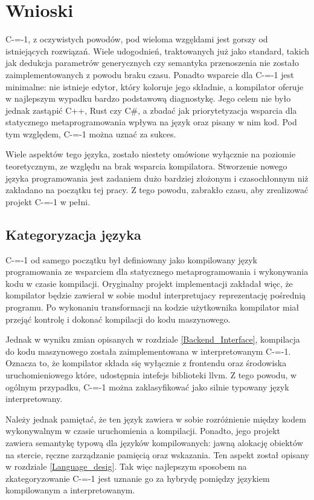 \section{Wnioski}

C-=-1, z oczywistych powodów, pod wieloma wzgęldami jest gorszy od istniejących rozwiązań.
Wiele udogodnień, traktowanych już jako standard, takich jak dedukcja parametrów generycznych czy semantyka przenoszenia nie zostało zaimplementowanych z powodu braku czasu.
Ponadto wsparcie dla C-=-1 jest minimalne: nie istnieje edytor, który koloruje jego składnie, a kompilator oferuje w najlepszym wypadku bardzo podstawową diagnostykę.
Jego celem nie było jednak zastąpić C++, Rust czy C\#, a zbadać jak priorytetyzacja wsparcia dla statycznego metaprogramowania wpływa na język oraz pisany w nim kod. 
Pod tym względem, C-=-1 można uznać za sukces.

Wiele aspektów tego języka, zostało niestety omówione wyłącznie na poziomie teoretycznym, ze względu na brak wsparcia kompilatora.
Stworzenie nowego języka programowania jest zadaniem dużo bardziej złożonym i czasochłonnym niż zakładano na początku tej pracy.
Z tego powodu, zabrakło czasu, aby zrealizować projekt C-=-1 w pełni.


\subsection{Kategoryzacja języka}

C-=-1 od samego początku był definiowany jako kompilowany język programowania ze wsparciem dla statycznego metaprogramowania i wykonywania kodu w czasie kompilacji.
Oryginalny projekt implementacji zakładał więc, że kompilator będzie zawierał w sobie moduł interpretujacy reprezentację pośrednią programu.
Po wykonaniu transformacji na kodzie użytkownika kompilator miał przejąć kontrolę i dokonać kompilacji do kodu maszynowego.

Jednak w wyniku zmian opisanych w rozdziale \ref{Backend_Interface}, kompilacja do kodu maszynowego została zaimplementowana w interpretowanym C-=-1.
Oznacza to, że kompilator składa się wyłącznie z frontendu oraz środowiska uruchomieniowego które, udostępnia intefejs biblioteki llvm.
Z tego powodu, w ogólnym przypadku, C-=-1 można zaklasyfikować jako silnie typowany język interpretowany.

Należy jednak pamiętać, że ten język zawiera w sobie rozróżnienie między kodem wykonywalnym w czasie uruchomienia a kompilacji.
Ponadto, jego projekt zawiera semantykę typową dla języków kompilowanych: jawną alokację obiektów na stercie, ręczne zarządzanie pamięcią oraz wskazania. 
Ten aspekt został opisany w rozdziale \ref{Language_desig}.
Tak więc najlepszym sposobem na zkategoryzowanie C-=-1 jest uznanie go za hybrydę pomiędzy językiem kompilowanym a interpretowanym.


